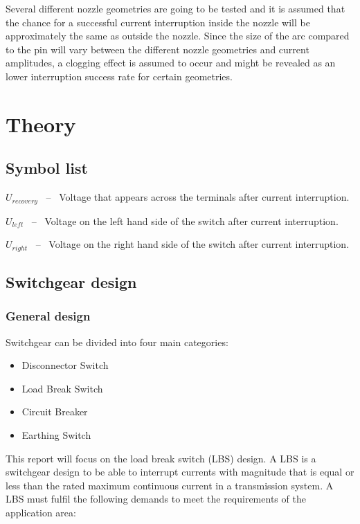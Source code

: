 \documentclass[10pt,a4paper]{article} %
\begin{document}
Several different nozzle geometries are going to be tested and it is assumed that the chance for a successful current interruption inside the nozzle will be approximately the same as outside the nozzle. Since the size of the arc compared to the pin will vary between the different nozzle geometries and current amplitudes, a clogging effect is assumed to occur and might be revealed as an lower interruption success rate for certain geometries.

\newpage
\section{Theory}
\subsection*{Symbol list}
\begin{description}
\item{$U_{recovery}$} \ -- \ Voltage that appears across the terminals after current interruption.
\item{$U_{left}$} \ -- \ Voltage on the left hand side of the switch after current interruption.
\item{$U_{right}$} \ -- \ Voltage on the right hand side of the switch after current interruption.
\end{description}
\newpage
\subsection{Switchgear design}
\subsubsection{General design} \label{sec:genDes}
Switchgear can be divided into four main categories:
\begin{itemize}
\item Disconnector Switch
\item Load Break Switch
\item Circuit Breaker
\item Earthing Switch
\end{itemize}
This report will focus on the load break switch (LBS) design. A LBS is a switchgear design to be able to interrupt currents with magnitude that is equal or less than the rated maximum continuous current in a transmission system. A LBS must fulfil the following demands to meet the requirements of the application area:
\end{document}
